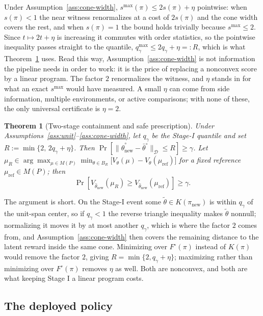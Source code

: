 \documentclass{article}
\newtheorem{theorem}{Theorem}
\newcommand{\Dnorm}[1]{\|#1\|_{\mathcal D}}
\begin{document}
Under Assumption~\ref{ass:cone-width}, $s^{\max}(\pi)\le2s(\pi)+\eta$
pointwise: when $s(\pi)<1$ the near witness renormalizes at a cost of
$2s(\pi)$ and the cone width covers the rest, and when $s(\pi)=1$ the bound
holds trivially because $s^{\max}\le2$. Since $t\mapsto2t+\eta$ is increasing
it commutes with order statistics, so the pointwise inequality passes straight
to the quantile, $q^{\max}_\gamma\le2q_\gamma+\eta=:R$, which is what
Theorem~\ref{thm:containment} uses. Read this way,
Assumption~\ref{ass:cone-width} is not information the pipeline needs in order
to work: it is the price of replacing a nonconvex score by a linear program.
The factor $2$ renormalizes the witness, and $\eta$ stands in for what an exact
$s^{\max}$ would have measured. A small $\eta$ can come from side information,
multiple environments, or active comparisons; with none of these, the only
universal certificate is $\eta=2$.

\begin{theorem}[Two-stage containment and safe prescription]
\label{thm:containment}
Under Assumptions~\ref{ass:unit}--\ref{ass:cone-width}, let $q_\gamma$ be the
Stage-I quantile and set $R:=\min\{2,\,2q_\gamma+\eta\}$. Then
$\Pr[\Dnorm{\hat\theta_{\mathrm{new}}^\circ-\bar\theta^\circ}\le R]\ge\gamma$.
Let $\mu_R\in\arg\max_{\mu\in M(P)}\min_{\theta\in B_R}\big[V_\theta(\mu)
-V_\theta(\mu_{\mathrm{ref}})\big]$ for a fixed reference
$\mu_{\mathrm{ref}}\in M(P)$; then
\[
\Pr\!\left[V_{\hat\theta_{\mathrm{new}}}(\mu_R)
\ge V_{\hat\theta_{\mathrm{new}}}(\mu_{\mathrm{ref}})\right]\ge\gamma .
\]
\end{theorem}

The argument is short. On the Stage-I event some
$\tilde\theta\in K(\pi_{\mathrm{new}})$ is within $q_\gamma$ of the unit-span
center, so if $q_\gamma<1$ the reverse triangle inequality makes $\tilde\theta$
nonnull; normalizing it moves it by at most another $q_\gamma$, which is where
the factor $2$ comes from, and Assumption~\ref{ass:cone-width} then covers the
remaining distance to the latent reward inside the same cone. Minimizing over
$F^\circ(\pi)$ instead of $K(\pi)$ would remove the factor $2$, giving
$R=\min\{2,q_\gamma+\eta\}$; maximizing rather than minimizing over
$F^\circ(\pi)$ removes $\eta$ as well. Both are nonconvex, and both are what
keeping Stage I a linear program costs.

\subsection{The deployed policy}
\label{sec:policy}
\end{document}
